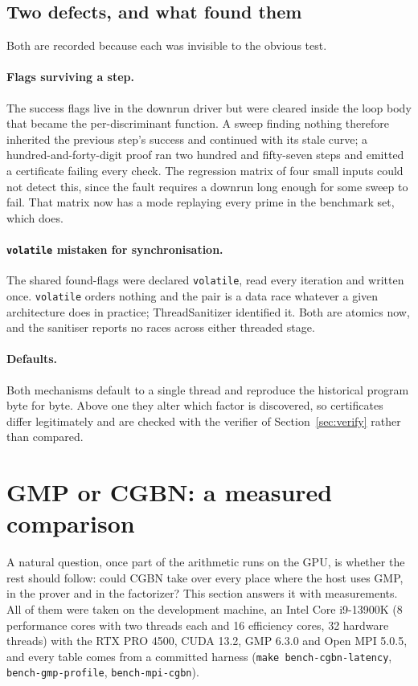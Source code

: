 \documentclass[11pt,a4paper]{article}
\newcommand{\code}[1]{\texttt{#1}}
\begin{document}
\subsection{Two defects, and what found them}

Both are recorded because each was invisible to the obvious test.

\paragraph{Flags surviving a step.} The success flags live in the downrun
driver but were cleared inside the loop body that became the
per-discriminant function. A sweep finding nothing therefore inherited
the previous step's success and continued with its stale curve; a
hundred-and-forty-digit proof ran two hundred and fifty-seven steps and
emitted a certificate failing every check. The regression matrix of four
small inputs could not detect this, since the fault requires a downrun
long enough for some sweep to fail. That matrix now has a mode replaying
every prime in the benchmark set, which does.

\paragraph{\code{volatile} mistaken for synchronisation.} The shared
found-flags were declared \code{volatile}, read every iteration and
written once. \code{volatile} orders nothing and the pair is a data race
whatever a given architecture does in practice; ThreadSanitizer
identified it. Both are atomics now, and the sanitiser reports no races
across either threaded stage.

\paragraph{Defaults.} Both mechanisms default to a single thread and
reproduce the historical program byte for byte. Above one they alter
which factor is discovered, so certificates differ legitimately and are
checked with the verifier of Section~\ref{sec:verify} rather than
compared.

\section{GMP or CGBN: a measured comparison}
\label{sec:gmpcgbn}

A natural question, once part of the arithmetic runs on the GPU, is whether the rest should
follow: could CGBN take over every place where the host uses GMP, in the prover and in the
factorizer? This section answers it with measurements. All of them were taken on the
development machine, an Intel Core i9-13900K (8 performance cores with two threads each and 16
efficiency cores, 32 hardware threads) with the RTX PRO 4500, CUDA 13.2, GMP 6.3.0 and Open
MPI 5.0.5, and every table comes from a committed harness (\code{make bench-cgbn-latency},
\code{bench-gmp-profile}, \code{bench-mpi-cgbn}).
\end{document}

